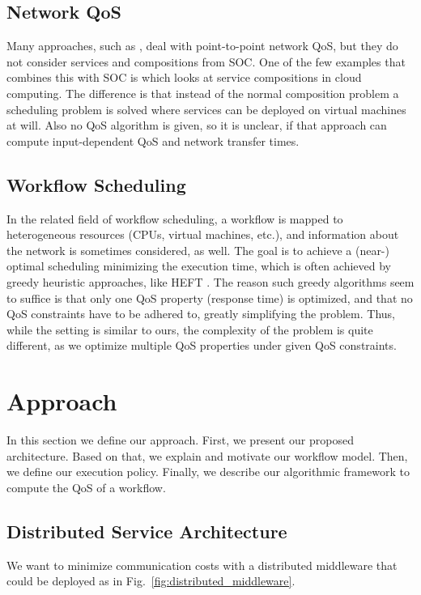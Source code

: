 \documentclass[10pt, conference, compsocconf]{IEEEtran}
\begin{document}
\subsection{Network QoS}
\noindent Many approaches, such as \cite{Boutaba2005,Jin2007}, deal with point-to-point network QoS,
	but they do not consider services and compositions from SOC.
One of the few examples that combines this with SOC is \cite{Ye2011}
	which looks at service compositions in cloud computing.
The difference is that instead of the normal composition problem a scheduling problem is solved where services can be deployed on virtual machines at will.
Also no QoS algorithm is given, so it is unclear, if that approach can compute input-dependent QoS and network transfer times.

\subsection{Workflow Scheduling}


\noindent In the related field of workflow scheduling,
	a workflow is mapped to heterogeneous resources (CPUs, virtual machines, etc.),
		and information about the network is sometimes considered, as well.
The goal is to achieve a \mbox{(near-)}\\optimal scheduling minimizing the execution time,
	which is often achieved by greedy heuristic approaches, like HEFT \cite{To2002}.
The reason such greedy algorithms seem to suffice is that only one QoS property (response time) is optimized,
	and that no QoS constraints have to be adhered to, greatly simplifying the problem.
Thus, while the setting is similar to ours,
	the complexity of the problem is quite different,
		as we optimize multiple QoS properties under given QoS constraints.

\section{Approach}
\label{approach}
\noindent In this section we define our approach.
First, we present our proposed architecture.
Based on that, we explain and motivate our workflow model.
Then, we define our execution policy.
Finally, we describe our algorithmic framework to compute the QoS of a workflow.

\subsection{Distributed Service Architecture}
\noindent We want to minimize communication costs with a distributed middleware	that could be deployed as in Fig.~\ref{fig:distributed_middleware}.
\end{document}
